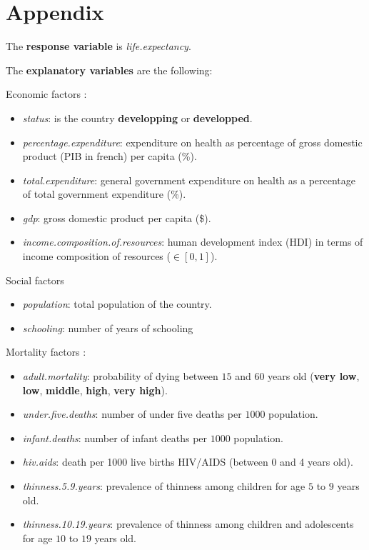 \section*{Appendix}

The \textbf{response variable} is \textit{life.expectancy}.

The \textbf{explanatory variables} are the following:

Economic factors :
\begin{itemize}
	\item \textit{status}: is the country \textbf{developping} or \textbf{developped}.
	\item \textit{percentage.expenditure}: expenditure on health as percentage of gross domestic product (PIB in french) per capita (\%).
	\item \textit{total.expenditure}: general government expenditure on health as a percentage of total government expenditure (\%).
	\item \textit{gdp}: gross domestic product per capita (\$).
	\item \textit{income.composition.of.resources}: human development index (HDI) in terms of income composition of resources ($\in [0,1]$).
\end{itemize}

Social factors
\begin{itemize}
	\item \textit{population}: total population of the country.
	\item \textit{schooling}: number of years of schooling
\end{itemize}

Mortality factors : 
\begin{itemize}
	\item \textit{adult.mortality}: probability of dying between $15$ and $60$ years old (\textbf{very low}, \textbf{low}, \textbf{middle}, \textbf{high}, \textbf{very high}).
	\item \textit{under.five.deaths}: number of under five deaths per $1000$ population.
	\item \textit{infant.deaths}: number of infant deaths per $1000$ population.
	\item \textit{hiv.aids}: death per 1000 live births HIV/AIDS (between 0 and 4 years old).
	\item \textit{thinness.5.9.years}: prevalence of thinness among children for age $5$ to $9$ years old.
	\item \textit{thinness.10.19.years}: prevalence of thinness among children and adolescents for age $10$ to $19$ years old.
\end{itemize}


